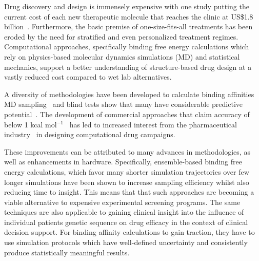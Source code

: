 
Drug discovery and design is immensely expensive with one study putting the
current cost of each new therapeutic molecule that reaches the clinic at
US\$1.8 billion~\cite{Paul2010}. Furthermore, the basic premise of
one-size-fits-all treatments has been eroded by the need for stratified and
even personalized treatment regimes. Computational approaches, specifically
binding free energy calculations which rely on physics-based molecular
dynamics simulations (MD) and statistical mechanics, support a better
understanding of structure-based drug design at a vastly reduced cost
compared to wet lab alternatives.



A diversity of methodologies have been developed to calculate binding
affinities MD sampling~\cite{Mobley2012} and blind tests show that many have
considerable predictive potential~\cite{Mey2017,Yin2017}. The development of
commercial approaches that claim accuracy of below 1 kcal
mol$^{-1}$~\cite{Wang2015} has led to increased interest from the
pharmaceutical industry~\cite{Ganesan2017} in designing computational drug
campaigns.


These improvements can be attributed to many advances in methodologies, as
well as enhancements in hardware. Specifically, ensemble-based binding free
energy calculations, which favor many shorter simulation trajectories over
few longer simulations have been shown to increase sampling efficiency whilst
also reducing time to insight. This means that that such approaches are
becoming a viable alternative to expensive experimental screening programs.
The same techniques are also applicable to gaining clinical insight into the
influence of individual patients genetic sequence on drug efficacy in the
context of clinical decision support. For binding affinity calculations to
gain traction, they have to use simulation protocols which have well-defined
uncertainty and consistently produce statistically meaningful results.

